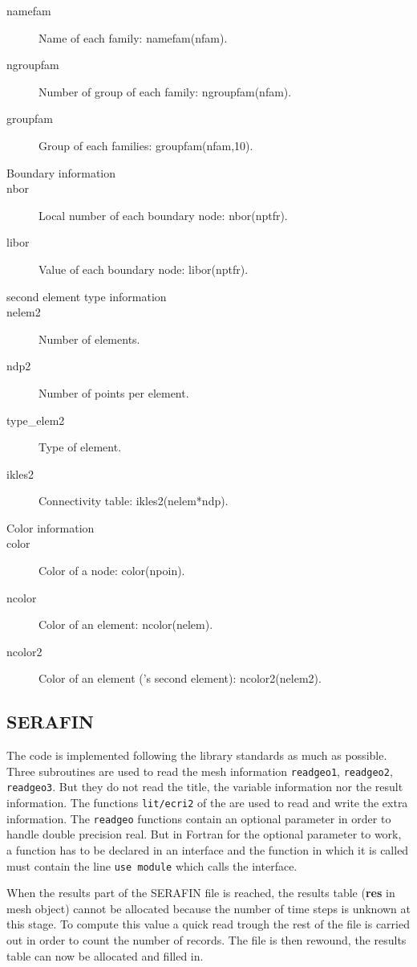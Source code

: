 \begin{description}
\item[namefam] Name of each family: namefam(nfam).
\item[ngroupfam] Number of group of each family: ngroupfam(nfam).
\item[groupfam] Group of each families: groupfam(nfam,10).
\item[Boundary information]
\item[nbor] Local number of each boundary node: nbor(nptfr).
\item[libor] Value of each boundary node: libor(nptfr).
\item[\estel second element type information]
\item[nelem2] Number of elements.
\item[ndp2] Number of points per element.
\item[type\_elem2] Type of element.
\item[ikles2] Connectivity table: ikles2(nelem*ndp).
\item[Color information]
\item[color] Color of a node: color(npoin).
\item[ncolor] Color of an element: ncolor(nelem).
\item[ncolor2] Color of an element (\estel's second element): ncolor2(nelem2).
\end{description}


\subsection{SERAFIN}

The code is implemented following the \bief library standards as much as
possible. Three subroutines are used to read the mesh information
\verb+readgeo1+, \verb+readgeo2+, \verb+readgeo3+. But they do not read the
title, the variable information nor the result information. The functions
\verb+lit/ecri2+ of the \bief are used to read and write the extra information.
The \verb+readgeo+ functions contain an optional parameter in order to handle
double precision real.  But in Fortran for the optional parameter to work, a
function has to be declared in an interface and the function in which it is
called must contain the line \verb+use module+ which calls the interface.

When the results part of the SERAFIN file is reached, the results table
(\textbf{res} in mesh object) cannot be allocated because the number of time
steps is unknown at this stage.  To compute this value a quick read trough the
rest of the file is carried out in order to count the number of records.  The
file is then rewound, the results table can now be allocated and filled in.

